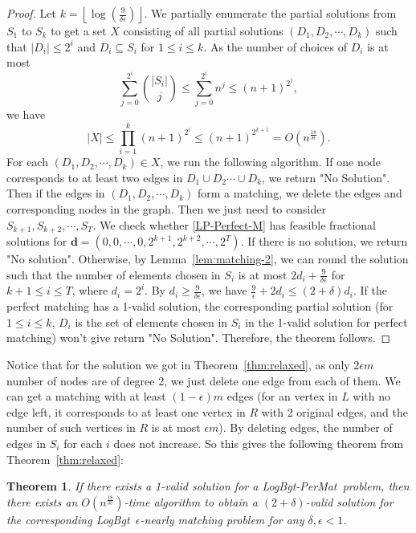 \documentclass[11pt,a4paper]{article} \usepackage{enumitem}
\newcommand{\floor}[1]{\left\lfloor #1 \right\rfloor}
\newcommand{\boldd}{\boldsymbol{d}}
\newcommand{\LBO}{\textsf{LogBgt}}
\newcommand{\LBOmatch}{\textsf{LogBgt-PerMat}}
\newtheorem{theorem}{Theorem}[section]
\theoremstyle{definition}
\begin{document}
\begin{proof}
Let $k=\floor{\log (\frac{9}{\delta\epsilon})}$. We partially enumerate the partial solutions from $S_1$ to $S_k$ to get a set $X$ consisting of all partial solutions $(D_1,D_2,\cdots,D_k)$ such that $|D_i|\leq 2^i$ and $D_i\subseteq S_i$ for $1\leq i\leq k$. As the number of choices of $D_i$ is at most
$$\sum_{j=0}^{2^i}\binom{|S_i|}{j}\leq \sum_{j=0}^{2^i}n^j\leq (n+1)^{2^j},$$
we have
$$|X|\leq \prod_{i=1}^{k}(n+1)^{2^i}\leq (n+1)^{2^{k+1}}=O(n^{\frac{18}{\delta\epsilon}}).$$
For each $(D_1,D_2,\cdots,D_k)\in X$, we run the following algorithm. If one node corresponds to at least two edges in $D_1\cup D_2\cdots\cup D_k$, we return "No Solution". 
Then if the edges in $(D_1,D_2,\cdots,D_k)$ form a matching, we delete the edges and corresponding nodes in the graph. Then we just need to consider $S_{k+1},S_{k+2},\cdots,S_T$. 
We check whether \ref{LP-Perfect-M} has feasible fractional solutions for $\boldd=(0,0,\cdots,0,2^{k+1},2^{k+2},\cdots,2^T)$. 
If there is no solution, we return "No solution". Otherwise, by Lemma~\ref{lem:matching-2}, we can round the solution such that the number of elements chosen in $S_i$ is at most $2d_i+\frac{9}{\delta\epsilon}$ for $k+1\leq i\leq T$, where $d_i=2^i$. 
By $d_i\geq \frac{9}{\delta\epsilon}$, we have $\frac{9}{\epsilon}+2d_i\leq (2+\delta)d_i$. If the perfect matching has a 1-valid solution, the corresponding partial solution (for $1\leq i\leq k$, $D_i$ is the set of elements chosen in $S_i$ in the 1-valid solution for perfect matching) won't give return "No Solution".
Therefore, the theorem follows.
\end{proof}

Notice that for the solution we got in Theorem~\ref{thm:relaxed}, as only $2\epsilon m$ number of nodes are of degree 2, we just delete one edge from each of them. 
We can get a matching with at least $(1-\epsilon)m$ edges (for an vertex in $L$ with no edge left, it corresponds to at least one vertex in $R$ with 2 original edges, and the number of such vertices in $R$ is at most $\epsilon m$). 
By deleting edges, the number of edges in $S_i$ for each $i$ does not increase. So this gives the following theorem from Theorem~\ref{thm:relaxed}:

\begin{theorem} \label{thm:matching-i3}
If there exists a 1-valid solution for a \LBOmatch\ problem, then there exists an $O(n^{\frac{18}{\delta\epsilon}})$-time algorithm to obtain a $(2+\delta)$-valid solution for the corresponding \LBO\ $\epsilon$-nearly matching problem for any $\delta,\epsilon<1$.
\end{theorem}
\end{document}
